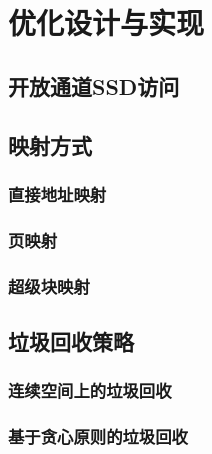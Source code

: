 \chapter{优化设计与实现}
\label{cha:imple}

\section{开放通道SSD访问}

\section{映射方式}
\subsection{直接地址映射}
\subsection{页映射}
\subsection{超级块映射}

\section{垃圾回收策略}
\subsection{连续空间上的垃圾回收}
\subsection{基于贪心原则的垃圾回收}